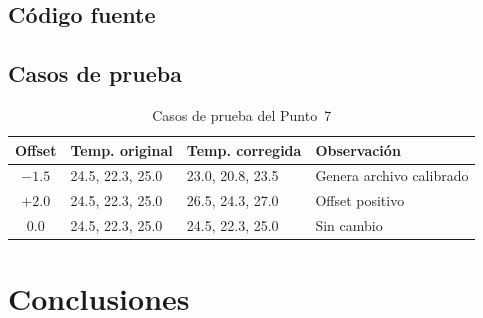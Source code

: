 \documentclass[12pt, letterpaper]{article}
\begin{document}
\subsection{Código fuente}



\subsection{Casos de prueba}

\begin{table}[H]
\centering
\small
\begin{tabular}{|c|p{2.8cm}|p{2.8cm}|p{3.8cm}|}
\hline
\textbf{Offset} & \textbf{Temp. original} & \textbf{Temp. corregida} & \textbf{Observación} \\
\hline
$-1.5$ & 24.5, 22.3, 25.0 & 23.0, 20.8, 23.5 &
Genera archivo calibrado \\
\hline
$+2.0$ & 24.5, 22.3, 25.0 & 26.5, 24.3, 27.0 &
Offset positivo \\
\hline
$0.0$ & 24.5, 22.3, 25.0 & 24.5, 22.3, 25.0 &
Sin cambio \\
\hline
\end{tabular}
\caption{Casos de prueba del Punto~7}
\end{table}

\section{Conclusiones}
\end{document}
